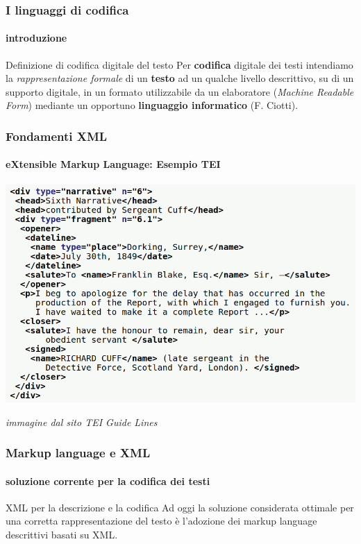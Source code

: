 \begin{frame}
	\frametitle{I linguaggi di codifica}
	\framesubtitle{introduzione}
	\addtocounter{nframe}{1}

	\begin{block}{Definizione di codifica digitale del testo}
		Per \textbf{codifica} digitale dei testi intendiamo la \textit{rappresentazione formale} di un \textbf{testo} ad un qualche livello descrittivo, su di un supporto digitale, in un formato utilizzabile da un elaboratore (\textit{Machine Readable Form}) mediante un opportuno \textbf{linguaggio informatico} (F. Ciotti).
	\end{block}

\end{frame}

\begin{frame}
	\frametitle{Fondamenti XML}
	\framesubtitle{eXtensible Markup Language: Esempio TEI}
	\addtocounter{nframe}{1}

	\begin{center}
		\includegraphics[width=.9\textwidth]{imgs/xml-TEI-Example.png}
	\end{center}

	\begin{tiny}
        \textit{immagine dal sito TEI Guide Lines}
    \end{tiny}

\end{frame}

\begin{frame}
	\frametitle{Markup language e XML}
	\framesubtitle{soluzione corrente per la codifica dei testi}
	\addtocounter{nframe}{1}

	\begin{block}{XML per la descrizione e la codifica}
		Ad oggi la soluzione considerata ottimale per una corretta rappresentazione del testo è l'adozione dei markup language descrittivi basati su XML.
	\end{block}

\end{frame}

